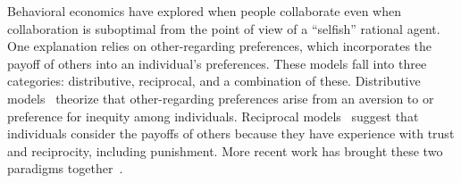 
Behavioral economics have explored when people collaborate even when
collaboration is suboptimal from the point of view of a ``selfish''
rational agent.  One explanation relies on other-regarding
preferences, which incorporates the payoff of others into an
individual's preferences. These models fall into three categories:
distributive, reciprocal, and a combination of these. Distributive
models~\cite{fehr1999theory} theorize that other-regarding preferences
arise from an aversion to or preference for inequity among
individuals. Reciprocal models~\cite{berg1995trust} suggest that
individuals consider the payoffs of others because they have
experience with trust and reciprocity, including punishment. More
recent work has brought these two paradigms
together~\cite{charness2002understanding, falk2003nature,
  bolton2000erc}.

